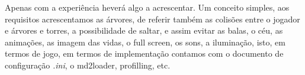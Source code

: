 Apenas com a experiência heverá algo a acrescentar. Um conceito simples, aos requisitos acrescentamos as árvores, de referir também as colisões entre o jogador e árvores e torres, a possibilidade de saltar, e assim evitar as balas, o céu, as animações, as imagem das vidas, o full screen, os sons, a iluminação, isto, em termos de jogo, em termos de implementação contamos com o documento de configuração \textit{.ini}, o md2loader, profilling, etc. 
